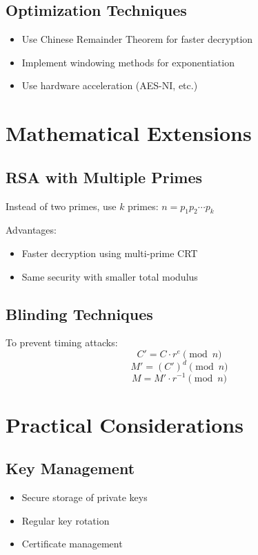 	\subsection{Optimization Techniques}
	
	\begin{itemize}
		\item Use Chinese Remainder Theorem for faster decryption
		\item Implement windowing methods for exponentiation
		\item Use hardware acceleration (AES-NI, etc.)
	\end{itemize}
	
	\section{Mathematical Extensions}
	
	\subsection{RSA with Multiple Primes}
	
	Instead of two primes, use $k$ primes: $n = p_1 p_2 \cdots p_k$
	
	Advantages:
	\begin{itemize}
		\item Faster decryption using multi-prime CRT
		\item Same security with smaller total modulus
	\end{itemize}
	
	\subsection{Blinding Techniques}
	
	To prevent timing attacks:
	\[
	C' = C \cdot r^e \pmod{n}
	\]
	\[
	M' = (C')^d \pmod{n}
	\]
	\[
	M = M' \cdot r^{-1} \pmod{n}
	\]
	
	\section{Practical Considerations}
	
	\subsection{Key Management}
	
	\begin{itemize}
		\item Secure storage of private keys
		\item Regular key rotation
		\item Certificate management
	\end{itemize}
	
